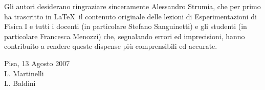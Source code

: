 Gli autori desiderano ringraziare sinceramente Alessandro Strumia,
che per primo ha trascritto in \LaTeX\ il contenuto originale delle lezioni di
Esperimentazioni di Fisica I e tutti i docenti (in particolare
Stefano Sanguinetti) e gli studenti (in particolare Francesca Menozzi) che,
segnalando errori ed imprecisioni, hanno contribuito a rendere queste dispense
pi\`u comprensibili ed accurate.

\begin{flushright}
\vspace{0.5cm}
Pisa, 13 Agosto 2007\\
\vspace{0.3cm}
L. Martinelli\\
L. Baldini
\end{flushright}
